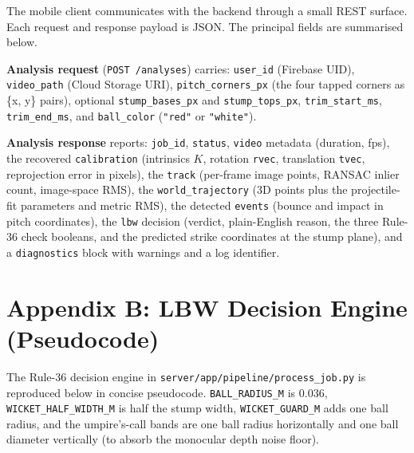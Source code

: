 \documentclass[12pt,a4paper]{report}
\begin{document}
The mobile client communicates with the backend through a small REST surface. Each request and response payload is JSON. The principal fields are summarised below.

\textbf{Analysis request} (\texttt{POST /analyses}) carries: \texttt{user\_id} (Firebase UID), \texttt{video\_path} (Cloud Storage URI), \texttt{pitch\_corners\_px} (the four tapped corners as \{x, y\} pairs), optional \texttt{stump\_bases\_px} and \texttt{stump\_tops\_px}, \texttt{trim\_start\_ms}, \texttt{trim\_end\_ms}, and \texttt{ball\_color} (\texttt{"red"} or \texttt{"white"}).

\textbf{Analysis response} reports: \texttt{job\_id}, \texttt{status}, \texttt{video} metadata (duration, fps), the recovered \texttt{calibration} (intrinsics $K$, rotation \texttt{rvec}, translation \texttt{tvec}, reprojection error in pixels), the \texttt{track} (per-frame image points, RANSAC inlier count, image-space RMS), the \texttt{world\_trajectory} (3D points plus the projectile-fit parameters and metric RMS), the detected \texttt{events} (bounce and impact in pitch coordinates), the \texttt{lbw} decision (verdict, plain-English reason, the three Rule-36 check booleans, and the predicted strike coordinates at the stump plane), and a \texttt{diagnostics} block with warnings and a log identifier.

\section*{Appendix B: LBW Decision Engine (Pseudocode)}

The Rule-36 decision engine in \texttt{server/app/pipeline/process\_job.py} is reproduced below in concise pseudocode. \texttt{BALL\_RADIUS\_M} is $0.036$, \texttt{WICKET\_HALF\_WIDTH\_M} is half the stump width, \texttt{WICKET\_GUARD\_M} adds one ball radius, and the umpire's-call bands are one ball radius horizontally and one ball diameter vertically (to absorb the monocular depth noise floor).
\end{document}
